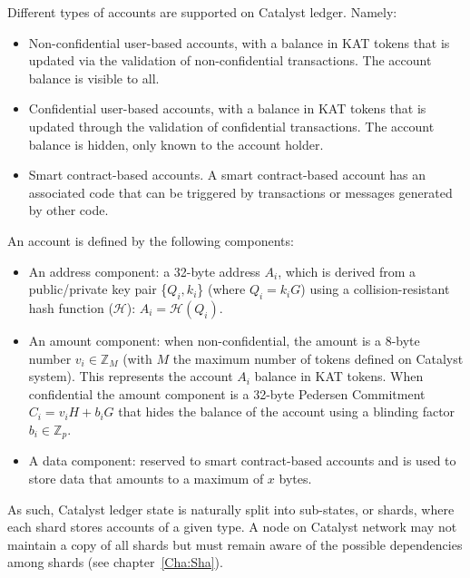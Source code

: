 Different types of accounts  are supported on Catalyst ledger. Namely:

\begin{itemize}
\item Non-confidential user-based accounts, with a balance in KAT tokens that is updated via the validation of non-confidential transactions. The account balance is visible to all.
\item Confidential user-based accounts, with a balance in KAT tokens that is updated through the validation of confidential transactions. The account balance is hidden, only known to the account holder.
\item Smart contract-based accounts. A smart contract-based account has an associated code that can be triggered by transactions or messages generated by other code.
\end{itemize}

An account is defined by the following components: 

\begin{itemize}
\item An address component: a 32-byte address $A_{i}$, which is derived from a public/private key pair \{$Q_{i},k_{i}$\} (where $Q_i= k_{i}G$) using a collision-resistant hash function ($\mathcal{H}$): $A_{i} = \mathcal{H}(Q_{i})$.
\item An amount component: when non-confidential, the amount is a 8-byte number $v_{i} \in \mathbb{Z}_M$ (with $M$ the maximum number of tokens defined on Catalyst system). This represents the account $A_{i}$ balance in KAT tokens. When confidential the amount component is a 32-byte Pedersen Commitment~\cite{confidential} $C_{i} = v_{i}H + b_{i}G$ that hides the balance of the account using a blinding factor $b_{i} \in  \mathbb{Z}_p$.
\item A data component: reserved to smart contract-based accounts and is used to store data that amounts to a maximum of $x$ bytes. 
\end{itemize}

As such, Catalyst ledger state is naturally split into sub-states, or shards, where each shard stores accounts of a given type. A node on Catalyst network may not maintain a copy of all shards but must remain aware of the possible dependencies among shards (see chapter~\ref{Cha:Sha}).\\